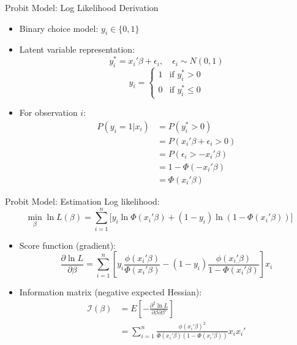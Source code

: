 \documentclass[11pt,dvipsnames,table,aspectratio=169]{beamer}
\begin{document}
\begin{frame}{Probit Model: Log Likelihood Derivation}
       \begin{itemize}[<+->]
       \item Binary choice model: $y_i \in \{0,1\}$
       \pause
       \item Latent variable representation:
           \[ y_i^* = x_i'\beta + \epsilon_i, \quad \epsilon_i \sim N(0,1) \]
           \[ y_i = \begin{cases} 1 & \text{if } y_i^* > 0 \\ 0 & \text{if } y_i^* \leq 0 \end{cases} \]
       \pause
       \item For observation $i$:
           \begin{align*}
           P(y_i = 1|x_i) &= P(y_i^* > 0) \\
           &= P(x_i'\beta + \epsilon_i > 0) \\
           &= P(\epsilon_i > -x_i'\beta) \\
           &= 1 - \Phi(-x_i'\beta)\\ 
           &= \Phi(x_i'\beta)           
       \end{align*}
\end{itemize}
\end{frame}

\begin{frame}{Probit Model: Estimation}
\small
       Log likelihood:
           \[ \min_\beta  \ln L(\beta) = \sum_{i=1}^n \Big[y_i\ln\Phi(x_i'\beta) + (1-y_i)\ln(1-\Phi(x_i'\beta))\Big] \]

\begin{itemize}
\item Score function (gradient):
    \[ \frac{\partial \ln L}{\partial \beta} = \sum_{i=1}^n \left[y_i\frac{\phi(x_i'\beta)}{\Phi(x_i'\beta)} - (1-y_i)\frac{\phi(x_i'\beta)}{1-\Phi(x_i'\beta)}\right]x_i \]
\pause
\item Information matrix (negative expected Hessian):
    \begin{align*}
    \mathcal{I}(\beta) &= E\left[-\frac{\partial^2 \ln L}{\partial \beta \partial \beta'}\right] \\
    &= \sum_{i=1}^n \frac{\phi(x_i'\beta)^2}{\Phi(x_i'\beta)(1-\Phi(x_i'\beta))}x_ix_i'
    \end{align*}
\end{itemize}
\end{frame}
\end{document}

